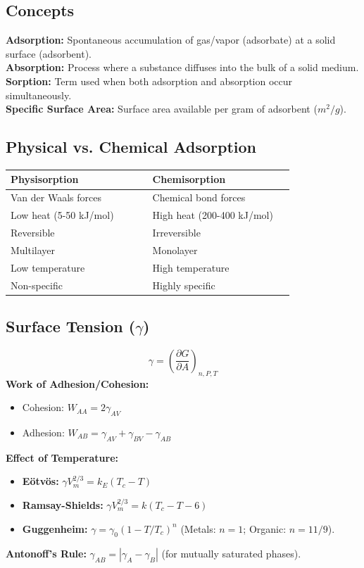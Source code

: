 \subsection{Concepts}
\textbf{Adsorption:} Spontaneous accumulation of gas/vapor (adsorbate) at a solid surface (adsorbent). \\
\textbf{Absorption:} Process where a substance diffuses into the bulk of a solid medium. \\
\textbf{Sorption:} Term used when both adsorption and absorption occur simultaneously. \\
\textbf{Specific Surface Area:} Surface area available per gram of adsorbent ($m^2/g$).

\subsection{Physical vs. Chemical Adsorption}
\begin{center}
\begin{tabular}{p{0.4\linewidth} p{0.4\linewidth}}
\toprule
\textbf{Physisorption} & \textbf{Chemisorption} \\
\midrule
Van der Waals forces & Chemical bond forces \\
Low heat (5-50 kJ/mol) & High heat (200-400 kJ/mol) \\
Reversible & Irreversible \\
Multilayer & Monolayer \\
Low temperature & High temperature \\
Non-specific & Highly specific \\
\bottomrule
\end{tabular}
\end{center}

\subsection{Surface Tension (\(\gamma\))}
\begin{equation}
    \gamma = \left(\frac{\partial G}{\partial A}\right)_{n,P,T}
\end{equation}
\textbf{Work of Adhesion/Cohesion:}
\begin{itemize}
    \item Cohesion: $W_{AA} = 2\gamma_{AV}$
    \item Adhesion: $W_{AB} = \gamma_{AV} + \gamma_{BV} - \gamma_{AB}$
\end{itemize}
\textbf{Effect of Temperature:}
\begin{itemize}
    \item \textbf{Eötvös:} $\gamma V_m^{2/3} = k_E (T_c - T)$
    \item \textbf{Ramsay-Shields:} $\gamma V_m^{2/3} = k (T_c - T - 6)$
    \item \textbf{Guggenheim:} $\gamma = \gamma_0 (1 - T/T_c)^n$ (Metals: $n=1$; Organic: $n=11/9$).
\end{itemize}
\textbf{Antonoff's Rule:} $\gamma_{AB} = |\gamma_A - \gamma_B|$ (for mutually saturated phases).

